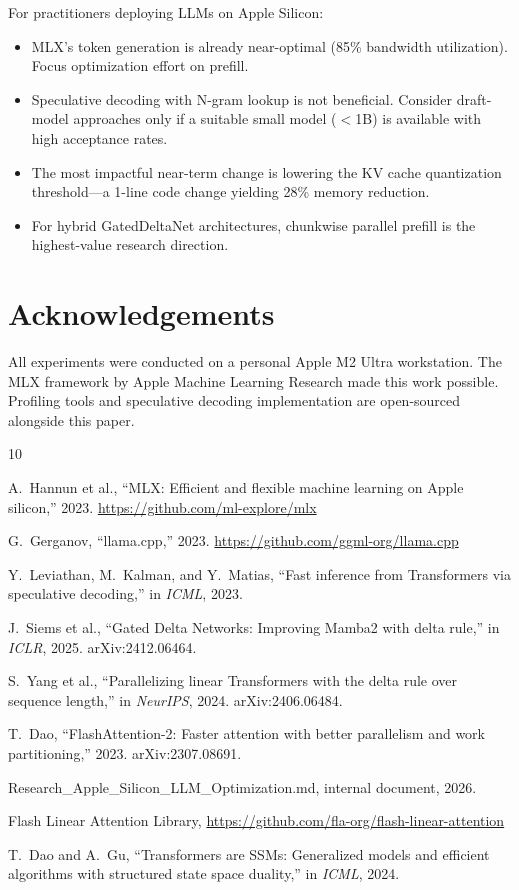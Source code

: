 \documentclass[11pt,a4paper]{article}
\begin{document}
For practitioners deploying LLMs on Apple Silicon:
\begin{itemize}[leftmargin=2em]
  \item MLX's token generation is already near-optimal (85\% bandwidth utilization). Focus optimization effort on prefill.
  \item Speculative decoding with N-gram lookup is not beneficial. Consider draft-model approaches only if a suitable small model ($<$1B) is available with high acceptance rates.
  \item The most impactful near-term change is lowering the KV cache quantization threshold---a 1-line code change yielding 28\% memory reduction.
  \item For hybrid GatedDeltaNet architectures, chunkwise parallel prefill is the highest-value research direction.
\end{itemize}

\section*{Acknowledgements}

All experiments were conducted on a personal Apple M2 Ultra workstation. The MLX framework by Apple Machine Learning Research made this work possible. Profiling tools and speculative decoding implementation are open-sourced alongside this paper.

\begin{thebibliography}{10}

A.~Hannun et al., ``MLX: Efficient and flexible machine learning on Apple silicon,'' 2023. \url{https://github.com/ml-explore/mlx}

G.~Gerganov, ``llama.cpp,'' 2023. \url{https://github.com/ggml-org/llama.cpp}

Y.~Leviathan, M.~Kalman, and Y.~Matias, ``Fast inference from Transformers via speculative decoding,'' in \emph{ICML}, 2023.

J.~Siems et al., ``Gated Delta Networks: Improving Mamba2 with delta rule,'' in \emph{ICLR}, 2025. arXiv:2412.06464.

S.~Yang et al., ``Parallelizing linear Transformers with the delta rule over sequence length,'' in \emph{NeurIPS}, 2024. arXiv:2406.06484.

T.~Dao, ``FlashAttention-2: Faster attention with better parallelism and work partitioning,'' 2023. arXiv:2307.08691.

Research\_Apple\_Silicon\_LLM\_Optimization.md, internal document, 2026.

Flash Linear Attention Library, \url{https://github.com/fla-org/flash-linear-attention}

T.~Dao and A.~Gu, ``Transformers are SSMs: Generalized models and efficient algorithms with structured state space duality,'' in \emph{ICML}, 2024.

\end{thebibliography}
\end{document}
